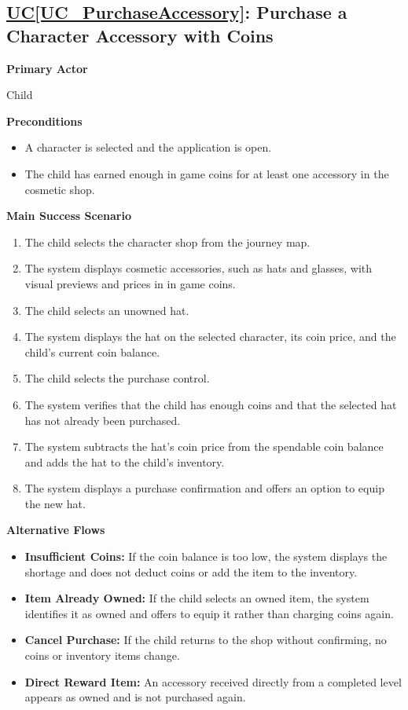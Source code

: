 \documentclass[12pt]{article}
\newcounter{ucnum} %
\newcommand{\ucref}[1]{\hyperref[#1]{UC\ref*{#1}}}
\begin{document}
\label{UC_PurchaseAccessory}
\subsection{\ucref{UC_PurchaseAccessory}: Purchase a Character Accessory with Coins}

\textbf{Primary Actor}

Child

\textbf{Preconditions}
\begin{itemize}
    \item A character is selected and the application is open.
    \item The child has earned enough in game coins for at least
    one accessory in the cosmetic shop.
\end{itemize}

\textbf{Main Success Scenario}
\begin{enumerate}
    \item The child selects the character shop from the journey map.
    \item The system displays cosmetic accessories, such as hats
    and glasses, with visual previews and prices in in game coins.
    \item The child selects an unowned hat.
    \item The system displays the hat on the selected character,
    its coin price, and the child's current coin balance.
    \item The child selects the purchase control.
    \item The system verifies that the child has enough coins and
    that the selected hat has not already been purchased.
    \item The system subtracts the hat's coin price from the
    spendable coin balance and adds the hat to the child's inventory.
    \item The system displays a purchase confirmation and offers
    an option to equip the new hat.
\end{enumerate}

\textbf{Alternative Flows}
\begin{itemize}
    \item \textbf{Insufficient Coins:} If the coin balance is too low,
    the system displays the shortage and does not deduct coins
    or add the item to the inventory.
    \item \textbf{Item Already Owned:} If the child selects an owned
    item, the system identifies it as owned and offers to equip
    it rather than charging coins again.
    \item \textbf{Cancel Purchase:} If the child returns to the shop
    without confirming, no coins or inventory items change.
    \item \textbf{Direct Reward Item:} An accessory received directly
    from a completed level appears as owned and is not purchased again.
\end{itemize}
\end{document}
